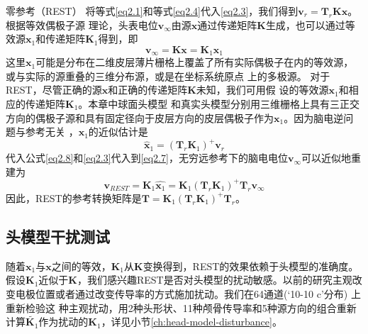 零参考（REST）
将等式\eqref{eq2.1}和等式\eqref{eq2.4}代入\eqref{eq2.3}，我们得到$\mathbf{v}_r=\mathbf{T}_{r}\mathbf{Kx}$。根据等效偶极子源
理论，头表电位$\mathbf{v}_{\infty}$由源$\mathbf{x}$通过传递矩阵$\mathbf{K}$生成，也可以通过等效源$\mathbf{x}_1$和传递矩阵$\mathbf{K}_1$得到，即
\begin{equation}\label{eq2.7}
\mathbf{v}_{\infty}=\mathbf{Kx}=\mathbf{K}_1\mathbf{x}_1
\end{equation}
这里$\mathbf{x}_1$可能是分布在二维皮层薄片栅格上覆盖了所有实际偶极子在内的等效源，或与实际的源重叠的三维分布源，或是在坐标系统原点
上的多极源。 对于REST，尽管正确的源$\mathbf{x}$和正确的传递矩阵$\mathbf{K}$未知，我们可用假
设的等效源$\mathbf{x}_1$和相应的传递矩阵$\mathbf{K}_1$。本章中球面头模型
和真实头模型分别用三维栅格上具有三正交方向的偶极子源和具有固定径向于皮层方向的皮层偶极子作为$\mathbf{x}_1$。因为脑电逆问题与参考无关
，$\mathbf{x}_1$的近似估计是
\begin{equation}\label{eq2.8}
\hat{\mathbf{x}}_1=(\mathbf{T}_r\mathbf{K}_1)^+\mathbf{v}_r
\end{equation}
代入公式\eqref{eq2.8}和\eqref{eq2.3}代入到\eqref{eq2.7}，无穷远参考下的脑电电位$\mathbf{v}_{\infty}$可以近似地重建为
\begin{equation}\label{eq2.9}
\mathbf{v}_{REST}=\mathbf{K}_1\hat{\mathbf{x}_1}=\mathbf{K}_1(\mathbf{T}_r\mathbf{K}_1)^+\mathbf{T}_r\mathbf{v}_\infty
\end{equation}
因此，REST的参考转换矩阵是$\mathbf{T}=\mathbf{K}_1(\mathbf{T}_r\mathbf{K}_1)^+\mathbf{T}_r$。
\subsection{头模型干扰测试}
随着$\mathbf{x}_1$与$\mathbf{x}$之间的等效，$\mathbf{K}_1$从$\mathbf{K}$变换得到，REST的效果依赖于头模型的准确度。假设$\mathbf{K}_1$近似于$\mathbf{K}$，我们感兴趣REST是否对头模型的扰动敏感。以前的研究主观改变电极位置或者通过改变传导率的方式施加扰动。我们在64通道(‘10-10 c’分布) 上重新检验这
种主观扰动，用2种头形状、11种颅骨传导率和5种源方向的组合重新计算$\tilde{\mathbf{K}_1}$作为扰动的$\mathbf{K}_1$，详见小节\ref{ch:head-model-disturbance}。

